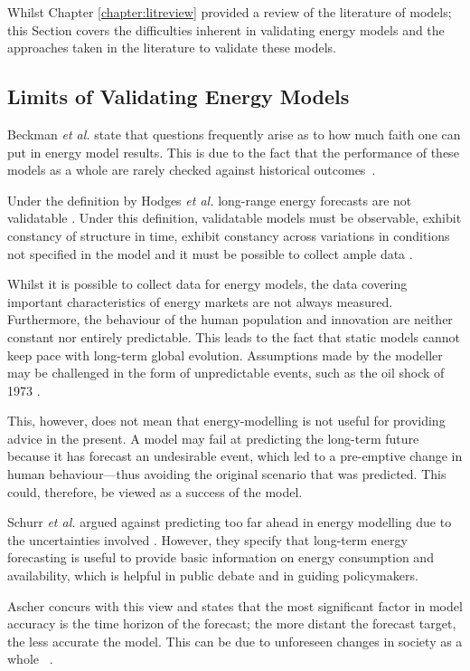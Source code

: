 Whilst Chapter \ref{chapter:litreview} provided a review of the literature of models; this Section covers the difficulties inherent in validating energy models and the approaches taken in the literature to validate these models.

\subsection{Limits of Validating Energy Models}

Beckman \textit{et al.} state that questions frequently arise as to how much faith one can put in energy model results. This is due to the fact that the performance of these models as a whole are rarely checked against historical outcomes~\cite{Beckman2011}.


Under the definition by Hodges \textit{et al.} \cite{Hodges} long-range energy forecasts are not validatable \cite{Craig2002}. Under this definition, validatable models must be observable, exhibit constancy of structure in time, exhibit constancy across variations in conditions not specified in the model and it must be possible to collect ample data \cite{Hodges}.


Whilst it is possible to collect data for energy models, the data covering important characteristics of energy markets are not always measured. Furthermore, the behaviour of the human population and innovation are neither constant nor entirely predictable. This leads to the fact that static models cannot keep pace with long-term global evolution. Assumptions made by the modeller may be challenged in the form of unpredictable events, such as the oil shock of 1973 \cite{Craig2002}.

This, however, does not mean that energy-modelling is not useful for providing advice in the present. A model may fail at predicting the long-term future because it has forecast an undesirable event, which led to a pre-emptive change in human behaviour—thus avoiding the original scenario that was predicted. This could, therefore, be viewed as a success of the model.

Schurr \textit{et al.} argued against predicting too far ahead in energy modelling due to the uncertainties involved \cite{Schurr_1961}. However, they specify that long-term energy forecasting is useful to provide basic information on energy consumption and availability, which is helpful in public debate and in guiding policymakers.


Ascher concurs with this view and states that the most significant factor in model accuracy is the time horizon of the forecast; the more distant the forecast target, the less accurate the model. This can be due to unforeseen changes in society as a whole ~\cite{gillespie_1979}.

